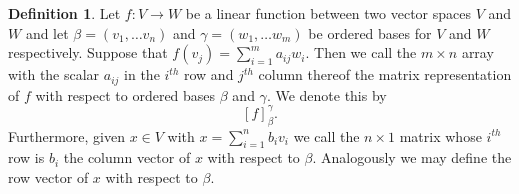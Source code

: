 \documentclass[oneside, 12pt]{book}
\theoremstyle{definition}
\newtheorem{defn}{Definition}[section]
\begin{document}
\begin{defn}
  \label{defn_mat}
  Let $f: V \to W$ be a linear function between two vector spaces $V$ and $W$ and let $\beta=(v_{1}, \dots v_{n})$ and $\gamma=(w_{1}, \dots w_{m})$ be ordered bases for $V$ and $W$ respectively. Suppose that $f(v_{j})=\sum\limits_{i=1}^{m}a_{ij}w_{i}$. Then we call the $m \times n$ array with the scalar $a_{ij}$ in the $i^{th}$ row and $j^{th}$ column thereof the matrix representation of $f$ with respect to ordered bases $\beta$ and $\gamma$. We denote this by \[[f]_{\beta}^{\gamma} .\] Furthermore, given $x \in V$ with $x=\sum\limits_{i=1}^{n}b_{i}v_{i}$ we call the $n \times 1$ matrix whose $i^{th}$ row is $b_{i}$ the column vector of $x$ with respect to $\beta$. Analogously we may define the row vector of $x$ with respect to $\beta$.
\end{defn}
\end{document}
